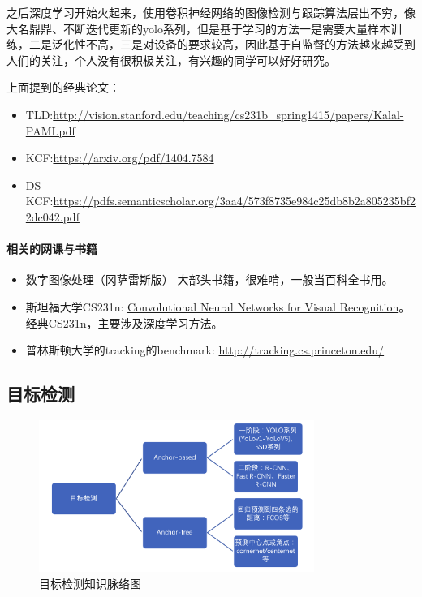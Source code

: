 \documentclass[lang=cn,11pt,a4paper]{elegant_template}
\begin{document}
之后深度学习开始火起来，使用卷积神经网络的图像检测与跟踪算法层出不穷，像大名鼎鼎、不断迭代更新的yolo系列，但是基于学习的方法一是需要大量样本训练，二是泛化性不高，三是对设备的要求较高，因此基于自监督的方法越来越受到人们的关注，个人没有很积极关注，有兴趣的同学可以好好研究。

上面提到的经典论文：
\begin{itemize}
    \item TLD:\href{http://vision.stanford.edu/teaching/cs231b_spring1415/papers/Kalal-PAMI.pdf}{http://vision.stanford.edu/teaching/cs231b\_spring1415/papers/Kalal-PAMI.pdf}
    \item KCF:\href{https://arxiv.org/pdf/1404.7584}{https://arxiv.org/pdf/1404.7584}
    \item DS-KCF:\href{https://pdfs.semanticscholar.org/3aa4/573f8735e984c25db8b2a805235bf22dc042.pdf}{https://pdfs.semanticscholar.org/3aa4/573f8735e984c25db8b2a805235bf22dc042.pdf}
\end{itemize}

\paragraph{相关的网课与书籍} 
\begin{itemize}
    \item 数字图像处理（冈萨雷斯版）  大部头书籍，很难啃，一般当百科全书用。
    \item 斯坦福大学CS231n: \href{http://cs231n.stanford.edu/syllabus.html}{Convolutional Neural Networks for Visual Recognition}。经典CS231n，主要涉及深度学习方法。
    \item 普林斯顿大学的tracking的benchmark: \href{http://tracking.cs.princeton.edu/}{http://tracking.cs.princeton.edu/}
\end{itemize}

\subsection{目标检测}
\begin{figure}[htbp]
  \centering
  \includegraphics[width=0.8\textwidth]{image/cv_2.png}
  \caption{目标检测知识脉络图}
\end{figure}
\end{document}
